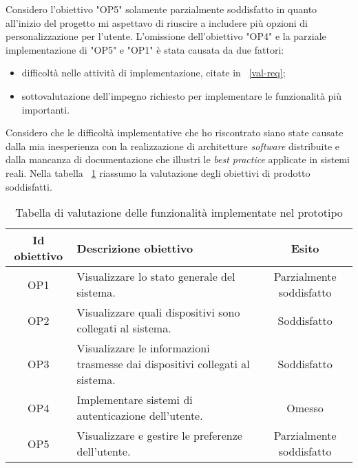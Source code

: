 Considero l'obiettivo "OP5" solamente parzialmente soddisfatto in quanto all'inizio del progetto mi aspettavo di riuscire a includere più opzioni di personalizzazione per l'utente.
L'omissione dell'obiettivo "OP4" e la parziale implementazione di "OP5" e "OP1" è stata causata da due fattori:
\begin{itemize}
  \item difficoltà nelle attività di implementazione, citate in ~\ref{val-req};
  \item sottovalutazione dell'impegno richiesto per implementare le funzionalità più importanti.
\end{itemize}
Considero che le difficoltà implementative che ho riscontrato siano state causate dalla mia inesperienza con la realizzazione di architetture \emph{software} distribuite e dalla mancanza di documentazione che illustri le \emph{best practice} applicate in sistemi reali.
Nella tabella ~\ref{tab:esito-obiettivi-prodotto} riassumo la valutazione degli obiettivi di prodotto soddisfatti.

\begin{table}[H]
\caption{Tabella di valutazione delle funzionalità implementate nel prototipo}
\label{tab:esito-obiettivi-prodotto}
\begin{tabularx}{\linewidth}{|c|X|c|}
\hline
\textbf{Id obiettivo} & \textbf{Descrizione obiettivo} & \textbf{Esito}\\
\hline
OP1 & Visualizzare lo stato generale del sistema. & Parzialmente soddisfatto \\
\hline
OP2 & Visualizzare quali dispositivi sono collegati al sistema. & Soddisfatto \\
\hline
OP3 & Visualizzare le informazioni trasmesse dai dispositivi collegati al sistema. & Soddisfatto \\
\hline
OP4 & Implementare sistemi di autenticazione dell'utente. & Omesso \\
\hline
OP5 & Visualizzare e gestire le preferenze dell'utente. & Parzialmente soddisfatto \\
\hline
\end{tabularx}
\end{table}

